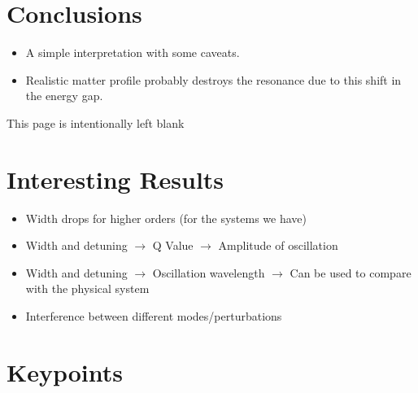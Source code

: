 \documentclass[%
preprint,
 amsmath,amssymb,
 aps,
]{revtex4-1}
\begin{document}
\section{\label{conclusions}Conclusions}



\begin{itemize}
    \item A simple interpretation with some caveats.
    \item Realistic matter profile probably destroys the resonance due to this shift in the energy gap.
\end{itemize}














\newpage\null\thispagestyle{empty}
\vspace{20em}
This page is intentionally left blank
\newpage


\clearpage
\appendix
\section{Interesting Results}


\begin{itemize}
    \item
Width drops for higher orders (for the systems we have)
    
    \item
Width and detuning $\to$ Q Value $\to$ Amplitude of oscillation
    
    \item
Width and detuning $\to$ Oscillation wavelength $\to$ Can be used to compare with the physical system

    \item
Interference between different modes/perturbations

\end{itemize}




\clearpage

\section{Keypoints}
\end{document}
